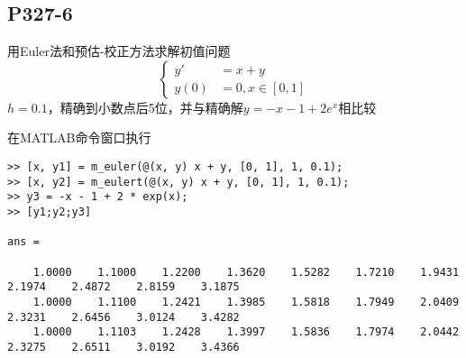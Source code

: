 \subsection{P327-6}
用Euler法和预估-校正方法求解初值问题
\begin{equation*}
\begin{cases}
y' & = x + y \\
y(0) & = 0, x \in [0, 1]
\end{cases}
\end{equation*}
$h=0.1$，精确到小数点后5位，并与精确解$y = -x - 1 + 2 e^x$相比较
\begin{SOLVE}
在MATLAB命令窗口执行
\begin{lstlisting}
>> [x, y1] = m_euler(@(x, y) x + y, [0, 1], 1, 0.1);
>> [x, y2] = m_eulert(@(x, y) x + y, [0, 1], 1, 0.1);
>> y3 = -x - 1 + 2 * exp(x);
>> [y1;y2;y3]

ans =

    1.0000    1.1000    1.2200    1.3620    1.5282    1.7210    1.9431    2.1974    2.4872    2.8159    3.1875
    1.0000    1.1100    1.2421    1.3985    1.5818    1.7949    2.0409    2.3231    2.6456    3.0124    3.4282
    1.0000    1.1103    1.2428    1.3997    1.5836    1.7974    2.0442    2.3275    2.6511    3.0192    3.4366

\end{lstlisting}
\end{SOLVE}